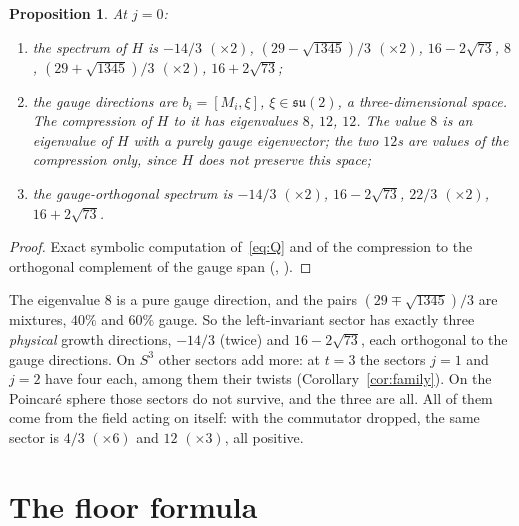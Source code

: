 \documentclass[11pt]{article}
\newtheorem{proposition}[theorem]{Proposition}
\theoremstyle{definition}
\theoremstyle{remark}
\newcommand{\su}{\mathfrak{su}(2)}
\begin{document}
\begin{proposition}\label{prop:spin0}
At $j=0$:
\begin{enumerate}
  \item the spectrum of $H$ is $-14/3$ $(\times2)$, $(29-\sqrt{1345})/3$ $(\times2)$, $16-2\sqrt{73}$,
    $8$, $(29+\sqrt{1345})/3$ $(\times2)$, $16+2\sqrt{73}$;
  \item the gauge directions are $b_i=[M_i,\xi]$, $\xi\in\su$, a three-dimensional space. The
    compression of $H$ to it has eigenvalues $8$, $12$, $12$. The value $8$ is an eigenvalue of $H$ with a
    purely gauge eigenvector; the two $12$s are values of the compression only, since $H$ does not preserve
    this space;
  \item the gauge-orthogonal spectrum is $-14/3$ $(\times2)$, $16-2\sqrt{73}$, $22/3$ $(\times2)$,
    $16+2\sqrt{73}$.
\end{enumerate}
\end{proposition}
\begin{proof}
Exact symbolic computation of~\eqref{eq:Q} and of the compression to the orthogonal complement of the
gauge span (,
).
\end{proof}

The eigenvalue $8$ is a pure gauge direction, and the pairs $(29\mp\sqrt{1345})/3$ are mixtures, $40\%$
and $60\%$ gauge. So the left-invariant sector has exactly three \emph{physical} growth directions, $-14/3$ (twice) and
$16-2\sqrt{73}$, each orthogonal to the gauge directions. On $S^3$ other sectors add more: at $t=3$ the
sectors $j=1$ and $j=2$ have four each, among them their twists (Corollary~\ref{cor:family}). On the Poincar\'e
sphere those sectors do not survive, and the three are all. All of them come from the field acting on
itself: with the commutator dropped, the same sector is $4/3$ $(\times6)$ and $12$ $(\times3)$, all
positive.

\section{The floor formula}\label{sec:bottom}
\end{document}

